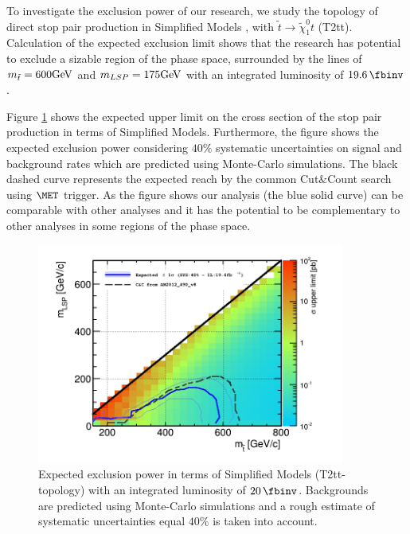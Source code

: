 To investigate the exclusion power of our research, we study the topology of direct stop pair production  in Simplified Models \cite{alves:sms}, with $\tilde{t}\to \tilde{\chi}^0_1 t$ (T2tt). 
Calculation of the expected exclusion limit shows that  
the research has potential to exclude 
a sizable region of the phase space, surrounded by the lines of $m_{\tilde{t}} = 600\rm{GeV}$ and $m_{LSP} = 175\rm{GeV}$ with an integrated luminosity of $19.6\,\fbinv$.



Figure \ref{fig:limit_20inf} shows the expected upper limit on the cross section of the stop pair production in terms of Simplified Models. 
Furthermore, the figure shows the expected exclusion power considering 
$40\%$ systematic uncertainties on signal and background rates which are predicted using Monte-Carlo simulations. The black 
dashed curve represents the expected reach by the common Cut$\&$Count \cite{cutandcountAN} search using $\MET$ trigger. 
As the figure shows our analysis (the blue solid curve) can be comparable with other analyses and   
it has the potential to be complementary to other analyses in some regions of the phase space.  



\begin{linenomath}
\begin{figure}[h]
\centering
\includegraphics[width=0.9\textwidth,keepaspectratio=true]{StatisticsFig/Exc_131030_196ifb.png}
\caption{Expected exclusion power in terms of Simplified Models (T2tt-topology) with an integrated luminosity of $20\,\fbinv$. Backgrounds are predicted using Monte-Carlo simulations and a rough estimate of systematic uncertainties equal 
$40\%$ is taken into account.}
\label{fig:limit_20inf}
\end{figure}
\end{linenomath}


